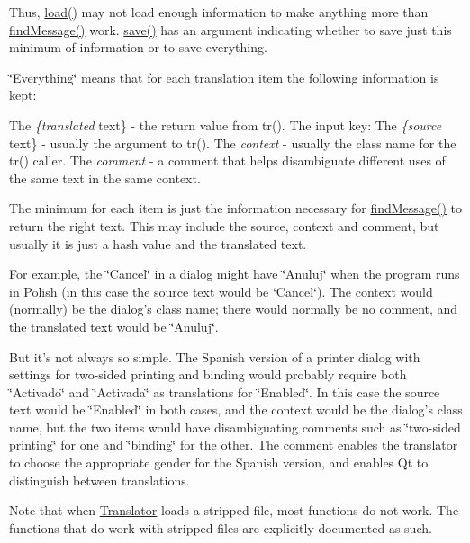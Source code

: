 Thus, \hyperlink{classTranslator_ae0cc0c124c3c00c87aae603c2ecc3be0}{load()} may not load enough information to make anything more than \hyperlink{classTranslator_ad8ed775f8a3375e029fc321d85e35de6}{find\+Message()} work. \hyperlink{classTranslator_a120c98f6d21bb5ae8787b9479e37c8ef}{save()} has an argument indicating whether to save just this minimum of information or to save everything.

\char`\"{}\+Everything\char`\"{} means that for each translation item the following information is kept\+:

The {\itshape \{translated} text\} -\/ the return value from tr().  The input key\+:   The {\itshape \{source} text\} -\/ usually the argument to tr().  The {\itshape context} -\/ usually the class name for the tr() caller.  The {\itshape comment} -\/ a comment that helps disambiguate different uses of the same text in the same context.  

The minimum for each item is just the information necessary for \hyperlink{classTranslator_ad8ed775f8a3375e029fc321d85e35de6}{find\+Message()} to return the right text. This may include the source, context and comment, but usually it is just a hash value and the translated text.

For example, the \char`\"{}\+Cancel\char`\"{} in a dialog might have \char`\"{}\+Anuluj\char`\"{} when the program runs in Polish (in this case the source text would be \char`\"{}\+Cancel\char`\"{}). The context would (normally) be the dialog's class name; there would normally be no comment, and the translated text would be \char`\"{}\+Anuluj\char`\"{}.

But it's not always so simple. The Spanish version of a printer dialog with settings for two-\/sided printing and binding would probably require both \char`\"{}\+Activado\char`\"{} and \char`\"{}\+Activada\char`\"{} as translations for \char`\"{}\+Enabled\char`\"{}. In this case the source text would be \char`\"{}\+Enabled\char`\"{} in both cases, and the context would be the dialog's class name, but the two items would have disambiguating comments such as \char`\"{}two-\/sided printing\char`\"{} for one and \char`\"{}binding\char`\"{} for the other. The comment enables the translator to choose the appropriate gender for the Spanish version, and enables Qt to distinguish between translations.

Note that when \hyperlink{classTranslator}{Translator} loads a stripped file, most functions do not work. The functions that do work with stripped files are explicitly documented as such.

